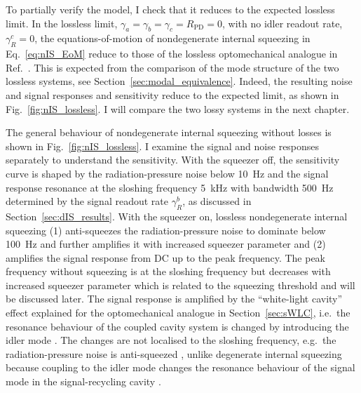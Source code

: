 To partially verify the model, I check that it reduces to the expected lossless limit.
In the lossless limit, $\gamma_a=\gamma_b=\gamma_c=R_\text{PD}=0$, with no idler readout rate, $\gamma^c_R=0$, the equations-of-motion of nondegenerate internal squeezing in Eq.~\ref{eq:nIS_EoM} reduce to those of the lossless optomechanical analogue in Ref.~\cite{liBroadbandSensitivityImprovement2020}. This is expected from the comparison of the mode structure of the two lossless systems, see Section~\ref{sec:modal_equivalence}.
Indeed, the resulting noise and signal responses and sensitivity reduce to the expected limit, as shown in Fig.~\ref{fig:nIS_lossless}.
I will compare the two lossy systems in the next chapter. 

The general behaviour of nondegenerate internal squeezing without losses is shown in Fig.~\ref{fig:nIS_lossless}. I examine the signal and noise responses separately to understand the sensitivity.
With the squeezer off, the sensitivity curve is shaped by the radiation-pressure noise below 10~Hz and the signal response resonance at the sloshing frequency 5~kHz with bandwidth 500~Hz determined by the signal readout rate $\gamma^b_R$, as discussed in Section~\ref{sec:dIS_results}.
With the squeezer on, lossless nondegenerate internal squeezing (1) anti-squeezes the radiation-pressure noise to dominate below 100~Hz and further amplifies it with increased squeezer parameter  and (2) amplifies the signal response from DC up to the peak frequency. The peak frequency without squeezing is at the sloshing frequency but decreases with increased squeezer parameter which is related to the squeezing threshold and will be discussed later.
The signal response is amplified by the ``white-light cavity'' effect explained for the optomechanical analogue in Section~\ref{sec:sWLC}, i.e.\ the resonance behaviour of the coupled cavity system is changed by introducing the idler mode .
The changes are not localised to the sloshing frequency, e.g.\ the radiation-pressure noise is anti-squeezed , unlike degenerate internal squeezing because coupling to the idler mode changes the resonance behaviour of the signal mode in the signal-recycling cavity .


